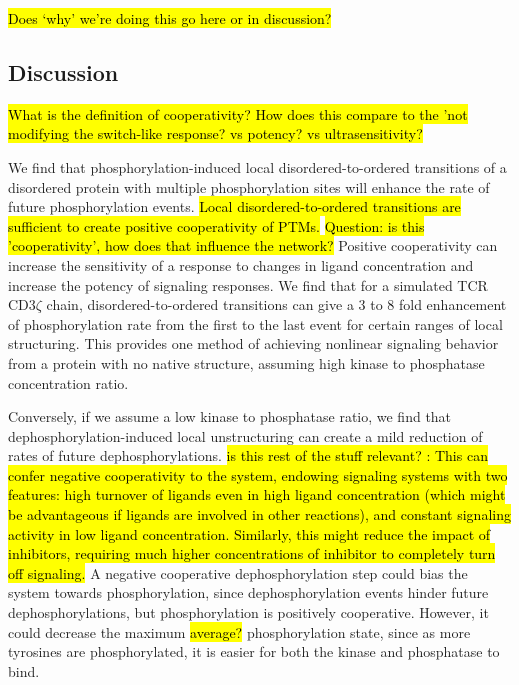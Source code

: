 \documentclass[../../AdvancementSummary.tex]{subfiles}
\begin{document}
\hl{Does `why' we're doing this go here or in discussion?}


\subsection{Discussion}

\hl{What is the definition of cooperativity?  How does this compare to the 'not modifying the switch-like response? vs potency? vs ultrasensitivity?}

We find that phosphorylation-induced local disordered-to-ordered transitions of a disordered protein with multiple phosphorylation sites will enhance the rate of future phosphorylation events. \hl{Local disordered-to-ordered transitions are sufficient to create positive cooperativity of PTMs.} \hl{Question: is this 'cooperativity', how does that influence the network?} Positive cooperativity can increase the sensitivity of a response to changes in ligand concentration and increase the potency of signaling responses. We find that for a simulated TCR CD3$\zeta$ chain, disordered-to-ordered transitions can give a 3 to 8 fold enhancement of phosphorylation rate from the first to the last event for certain ranges of local structuring. This provides one method of achieving nonlinear signaling behavior from a protein with no native structure, assuming high kinase to phosphatase concentration ratio. 

Conversely, if we assume a low kinase to phosphatase ratio, we find that dephosphorylation-induced local unstructuring can create a mild reduction of rates of future dephosphorylations. \hl{is this rest of the stuff relevant? : This can confer negative cooperativity to the system, endowing signaling systems with two features: high turnover of ligands even in high ligand concentration (which might be advantageous if ligands are involved in other reactions), and constant signaling activity in low ligand concentration. Similarly, this might reduce the impact of inhibitors, requiring much higher concentrations of inhibitor to completely turn off signaling.} A negative cooperative dephosphorylation step could bias the system towards phosphorylation, since dephosphorylation events hinder future dephosphorylations, but phosphorylation is positively cooperative. However, it could decrease the maximum \hl{average?} phosphorylation state, since as more tyrosines are phosphorylated, it is easier for both the kinase and phosphatase to bind. 
\end{document}
